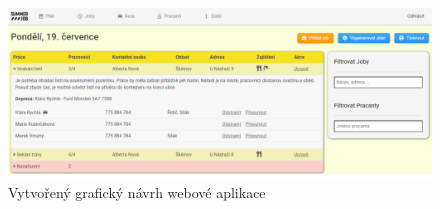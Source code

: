 \begin{figure}[ht]
    \centering
    \includegraphics[width=\textwidth]{chapters/images/bootstrap-studio}
    \caption{Vytvořený grafický návrh webové aplikace}
    \label{fig:design-detail}
\end{figure}